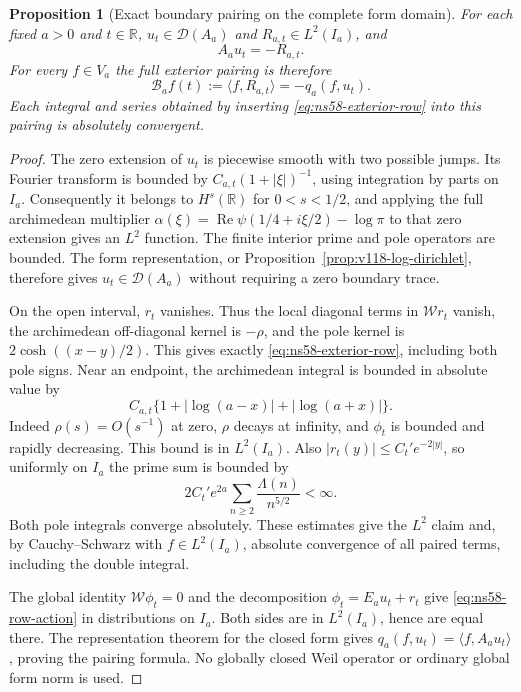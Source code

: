 \documentclass[11pt]{article}
\newtheorem{proposition}[theorem]{Proposition}
\theoremstyle{remark}
\begin{document}
\begin{proposition}[Exact boundary pairing on the complete form domain]
\label{prop:ns58-boundary-identity}
For each fixed $a>0$ and $t\in\mathbb R$,
$u_t\in\mathcal D(A_a)$ and $R_{a,t}\in L^2(I_a)$, and
\begin{equation}\label{eq:ns58-row-action}
 A_a u_t=-R_{a,t}.
\end{equation}
For every $f\in V_a$ the full exterior pairing is therefore
\begin{equation}\label{eq:ns58-boundary-pairing}
 \mathcal B_a f(t):=\langle f,R_{a,t}\rangle
                  =-q_a(f,u_t).
\end{equation}
Each integral and series obtained by inserting
\eqref{eq:ns58-exterior-row} into this pairing is absolutely convergent.
\end{proposition}
\begin{proof}
The zero extension of $u_t$ is piecewise smooth with two possible
jumps. Its Fourier transform is bounded by
$C_{a,t}(1+|\xi|)^{-1}$, using integration by parts on $I_a$.
Consequently it belongs to $H^s(\mathbb R)$ for $0<s<1/2$, and applying the
full archimedean multiplier
$\alpha(\xi)=\operatorname{Re}\psi(1/4+i\xi/2)-\log\pi$
to that zero extension gives an $L^2$ function. The finite interior prime and pole operators are
bounded. The form representation, or
Proposition~\ref{prop:v118-log-dirichlet}, therefore gives
$u_t\in\mathcal D(A_a)$ without requiring a zero boundary trace.

On the open interval, $r_t$ vanishes. Thus the local diagonal terms
in $\mathcal W r_t$ vanish, the archimedean off-diagonal kernel is
$-\rho$, and the pole kernel is $2\cosh((x-y)/2)$. This gives
exactly \eqref{eq:ns58-exterior-row}, including both pole signs.
Near an endpoint, the archimedean integral is bounded in absolute
value by
\[
 C_{a,t}\{1+|\log(a-x)|+|\log(a+x)|\}.
\]
Indeed $\rho(s)=O(s^{-1})$ at zero, $\rho$ decays at infinity,
and $\phi_t$ is bounded and rapidly decreasing. This bound is in
$L^2(I_a)$. Also $|r_t(y)|\le C_t' e^{-2|y|}$, so uniformly on
$I_a$ the prime sum is bounded by
\[
 2C_t'e^{2a}\sum_{n\ge2}\frac{\Lambda(n)}{n^{5/2}}<\infty.
\]
Both pole integrals converge absolutely. These estimates give the
$L^2$ claim and, by Cauchy--Schwarz with $f\in L^2(I_a)$,
absolute convergence of all paired terms, including the double integral.

The global identity $\mathcal W\phi_t=0$ and the decomposition
$\phi_t=E_a u_t+r_t$ give \eqref{eq:ns58-row-action} in distributions
on $I_a$. Both sides are in $L^2(I_a)$, hence are equal there.
The representation theorem for the closed form gives
$q_a(f,u_t)=\langle f,A_a u_t\rangle$, proving the pairing formula.
No globally closed Weil operator or ordinary global form norm is used.
\end{proof}
\end{document}
